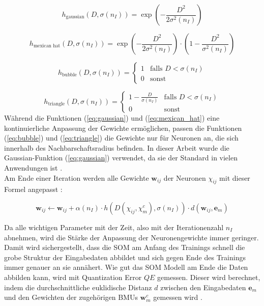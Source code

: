 \begin{equation}
    h_{\text{gaussian}}(D, \sigma(n_I)) = \exp\left(-\frac{D^2}{2\sigma^2(n_I)}\right)
    \label{eq:gaussian}
\end{equation}

\begin{equation}
    h_{\text{mexican hat}}(D, \sigma(n_I)) = \exp\left(-\frac{D^2}{2\sigma^2(n_I)}\right) \cdot \left(1 - \frac{D^2}{\sigma^2(n_I)}\right)
    \label{eq:mexican_hat}
\end{equation}

\begin{equation}
    h_{\text{bubble}}(D, \sigma(n_I)) =
    \begin{cases}
        1 & \text{falls } D < \sigma(n_I) \\
        0 & \text{sonst}
    \end{cases}
    \label{eq:bubble}
\end{equation}

\begin{equation}
    h_{\text{triangle}}(D, \sigma(n_I)) =
    \begin{cases}
        1 - \frac{D}{\sigma(n_I)} & \text{falls } D < \sigma(n_I) \\
        0 & \text{sonst}
    \end{cases}
    \label{eq:triangle}
\end{equation}
Während die Funktionen (\ref{eq:gaussian}) und (\ref{eq:mexican_hat}) eine kontinuierliche Anpassung der Gewichte ermöglichen, passen die Funktionen (\ref{eq:bubble}) und (\ref{eq:triangle}) die Gewichte nur für Neuronen an, die sich innerhalb des Nachbarschaftsradius befinden. In dieser Arbeit wurde die Gaussian-Funktion (\ref{eq:gaussian}) verwendet, da sie der Standard in vielen Anwendungen ist \parencite{kohonen_self-organizing_2001}.\\
Am Ende einer Iteration werden alle Gewichte $\mathbf{w}_{ij}$ der Neuronen $\chi_{ij}$ mit dieser Formel angepasst \parencite{vettigli_minisom_2021}:

\begin{equation}
    \mathbf{w}_{ij} \leftarrow \mathbf{w}_{ij} + \alpha(n_I) \cdot h(D(\chi_{ij}, \chi_{m}^c), \sigma(n_I)) \cdot d(\mathbf{w}_{ij}, \mathbf{e}_m)
\end{equation}

\noindent Da alle wichtigen Parameter mit der Zeit, also mit der Iterationenzahl $n_I$ abnehmen, wird die Stärke der Anpassung der Neuronengewichte immer geringer. Damit wird sichergestellt, dass die SOM am Anfang des Trainings schnell die grobe Struktur der Eingabedaten abbildet und sich gegen Ende des Trainings immer genauer an sie annähert. Wie gut das SOM Modell am Ende die Daten abbilden kann, wird mit Quantization Error $QE$ gemessen. Dieser wird berechnet, indem die durchschnittliche euklidische Distanz $d$ zwischen den Eingabedaten $\mathbf{e}_m$ und den Gewichten der zugehörigen BMUs $\mathbf{w}_m^c$ gemessen wird \parencites{natita_appropriate_2016}{vettigli_minisom_2021}.

